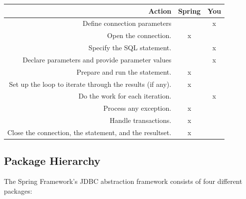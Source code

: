 \documentclass{scrartcl}
\begin{document}
\begin{table}[h!]
\begin{tabular}{|r|c|c|}
    \hline
    Action&  Spring&  You\\
    \hline
    Define connection parameters&  &  x\\
    \hline
    Open the connection.&  x&  \\
    \hline
    Specify the SQL statement.&  &  x\\
    \hline
    Declare parameters and provide parameter values&  &  x\\
    \hline
    Prepare and run the statement.&  x&  \\
    \hline
    Set up the loop to iterate through the results (if any).&  x&  \\
    \hline
    Do the work for each iteration.&  &  x\\
    \hline
    Process any exception.&  x&  \\
    \hline
    Handle transactions.&  x&  \\
    \hline
    Close the connection, the statement, and the resultset.&  x&  \\
    \hline
\end{tabular}
\end{table}

\subsection{Package Hierarchy}

The Spring Framework’s JDBC abstraction framework consists of four different packages:
\end{document}
